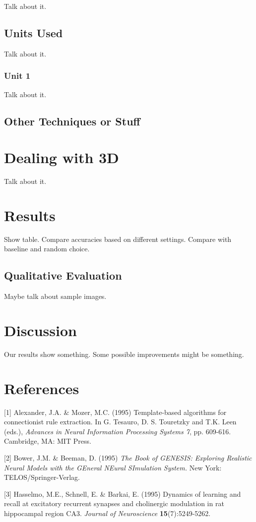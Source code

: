 \documentclass{article} %
\begin{document}
Talk about it.

\subsection{Units Used}

Talk about it.

\subsubsection{Unit 1}

Talk about it.

\subsection{Other Techniques or Stuff}

\section{Dealing with 3D}

Talk about it.

\section{Results}

Show table. Compare accuracies based on different settings. Compare with baseline and random choice.

\subsection{Qualitative Evaluation}

Maybe talk about sample images.

\section{Discussion}

Our results show something. Some possible improvements might be something.

\section*{References}

\small{
[1] Alexander, J.A. \& Mozer, M.C. (1995) Template-based algorithms
for connectionist rule extraction. In G. Tesauro, D. S. Touretzky
and T.K. Leen (eds.), {\it Advances in Neural Information Processing
Systems 7}, pp. 609-616. Cambridge, MA: MIT Press.

[2] Bower, J.M. \& Beeman, D. (1995) {\it The Book of GENESIS: Exploring
Realistic Neural Models with the GEneral NEural SImulation System.}
New York: TELOS/Springer-Verlag.

[3] Hasselmo, M.E., Schnell, E. \& Barkai, E. (1995) Dynamics of learning
and recall at excitatory recurrent synapses and cholinergic modulation
in rat hippocampal region CA3. {\it Journal of Neuroscience}
{\bf 15}(7):5249-5262.
}
\end{document}
